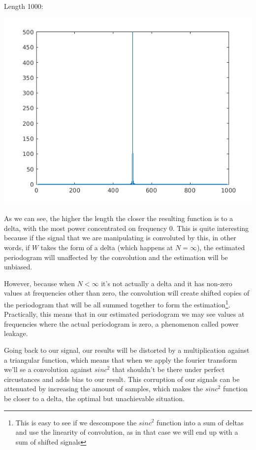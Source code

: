 \documentclass[conference,9pt]{IEEEtran}
\begin{document}
Length 1000:

\includegraphics[scale=0.6]{triang1000.png}

As we can see, the higher the length the closer the resulting function is to a delta, with the most power concentrated on frequency 0. This is quite interesting because if the signal that we are manipulating is convoluted by this, in other words, if $W$ takes the form of a delta (which happens at $N=\infty$), the estimated periodogram will unaffected by the convolution and the estimation will be unbiased.

However, because when $N<\infty$ it's not actually a delta and it has non-zero values at frequencies other than zero, the convolution will create shifted copies of the periodogram that will be all summed together to form the estimation\footnote{This is easy to see if we descompose the $sinc^2$ function into a sum of deltas and use the linearity of convolution, as in that case we will end up with a sum of shifted signals}. Practically, this means that in our estimated periodogram we may see values at frequencies where the actual periodogram is zero, a phenomenon called power leakage.

Going back to our signal, our results will be distorted by a multiplication against a triangular function, which means that when we apply the fourier transform we'll se a convolution against $sinc^2$ that shouldn't be there under perfect circustances and adds bias to our result. This corruption of our signals can be attenuated by increasing the amount of samples, which makes the $sinc^2$ function be closer to a delta, the optimal but unachievable situation.
\end{document}
